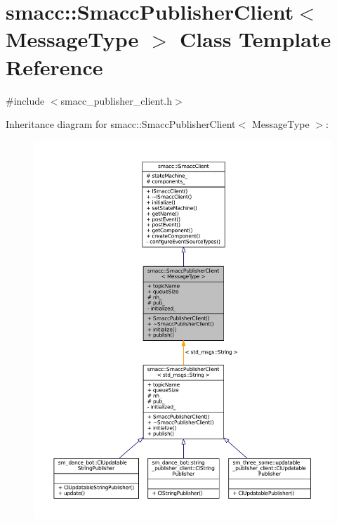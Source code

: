 \hypertarget{classsmacc_1_1SmaccPublisherClient}{}\section{smacc\+:\+:Smacc\+Publisher\+Client$<$ Message\+Type $>$ Class Template Reference}
\label{classsmacc_1_1SmaccPublisherClient}


{\ttfamily \#include $<$smacc\+\_\+publisher\+\_\+client.\+h$>$}



Inheritance diagram for smacc\+:\+:Smacc\+Publisher\+Client$<$ Message\+Type $>$\+:
\nopagebreak
\begin{figure}[H]
\begin{center}
\leavevmode
\includegraphics[width=350pt]{classsmacc_1_1SmaccPublisherClient__inherit__graph}
\end{center}
\end{figure}


